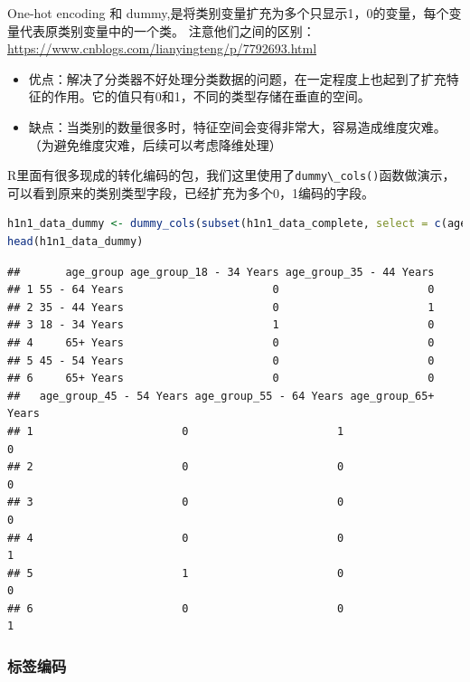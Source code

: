 \documentclass[]{ctexbook}
\providecommand{\tightlist}{%
  \setlength{\itemsep}{0pt}\setlength{\parskip}{0pt}}
\newcommand{\passthrough}[1]{#1}
\begin{document}
One-hot encoding 和 dummy,是将类别变量扩充为多个只显示1，0的变量，每个变量代表原类别变量中的一个类。 注意他们之间的区别：\url{https://www.cnblogs.com/lianyingteng/p/7792693.html}

\begin{itemize}
\tightlist
\item
  优点：解决了分类器不好处理分类数据的问题，在一定程度上也起到了扩充特征的作用。它的值只有0和1，不同的类型存储在垂直的空间。\\
\item
  缺点：当类别的数量很多时，特征空间会变得非常大，容易造成维度灾难。（为避免维度灾难，后续可以考虑降维处理）
\end{itemize}

R里面有很多现成的转化编码的包，我们这里使用了\passthrough{\lstinline!dummy\_cols()!}函数做演示，可以看到原来的类别类型字段，已经扩充为多个0，1编码的字段。

\begin{lstlisting}[language=R]
h1n1_data_dummy <- dummy_cols(subset(h1n1_data_complete, select = c(age_group)), select_columns = c("age_group"))
head(h1n1_data_dummy)
\end{lstlisting}

\begin{lstlisting}
##       age_group age_group_18 - 34 Years age_group_35 - 44 Years
## 1 55 - 64 Years                       0                       0
## 2 35 - 44 Years                       0                       1
## 3 18 - 34 Years                       1                       0
## 4     65+ Years                       0                       0
## 5 45 - 54 Years                       0                       0
## 6     65+ Years                       0                       0
##   age_group_45 - 54 Years age_group_55 - 64 Years age_group_65+ Years
## 1                       0                       1                   0
## 2                       0                       0                   0
## 3                       0                       0                   0
## 4                       0                       0                   1
## 5                       1                       0                   0
## 6                       0                       0                   1
\end{lstlisting}

\hypertarget{ux6807ux7b7eux7f16ux7801}{%
\subsubsection{标签编码}\label{ux6807ux7b7eux7f16ux7801}}
\end{document}
